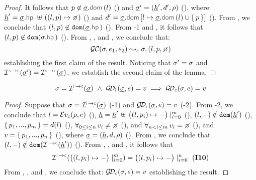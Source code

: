 \begin{proof}
    \noindent {} It follows that $p \not\in \istate.\domsel(\loc)$ () and 
       $\underline{\sigma}' = (\underline{h}', d', \rho)$ (), where: 
       $\iheap' = \istate.\hpsel \dunion ((\loc, p) \mapsto \none)$ () and $\idom' = \istate.\domsel[\loc \mapsto \istate.\domsel(\loc) \cup \jsilset{p}]$ (). 
       From , we conclude that $(\loc, p) \not\in \domain(\istate.\hpsel)$ ().
       From \hyp{1} and , it follows that $(\loc, p) \not\in \domain(\jstate.\hpsel)$ (). 
       From , , and , we conclude that: 
       $$
          \absgetcellrule{\concrete}{\jstate, \jsilexpr_1, \jsilexpr_2}{\jstate, (\loc, p, \none)}
       $$
       establishing the first claim of the result. Noticing that $\sigma' = \sigma$ and 
       $\interpret{\symbconc}{}(\istate') = \interpret{\symbconc}{}(\istate)$, we 
       establish the second claim of the lemma.
\end{proof}


\begin{lemma}\label{lemma:getdomain:erasure}
$$
\jstate = \interpret{\instconc}{}(\istate) \ \wedge \ 
  \absgetdomainfun{\instrumented}(\istate, \jsilexpr) = \val  
  \implies \absgetdomainfun{\concrete}(\jstate, \jsilexpr) = \val
$$
\end{lemma}
\begin{proof}
Suppose that $\jstate = \interpret{\instconc}{}(\istate)$ (\hyp{1}) and 
$\absgetdomainfun{\instrumented}(\istate, \jsilexpr) = \val$ (\hyp{2}). 
From \hyp{2}, we conclude that $\loc = \evalexpr{\concrete}(\store, \jsilexpr)$ (), 
$\underline{h} = \underline{h}' \, \uplus \, \big((l, p_i) \mapsto - \big)\mid_{i = 0}^m$ (\ieq{2}), 
$(l,-) \notin \texttt{dom} (\underline{h}')$ (\ieq{3}), 
$\{ \, p_1, ..., p_m \, \} = d(l)$ (), 
$\forall_{0 \leq i \leq n} \, \val_i \neq \none$ (), and
$\forall_{n < i \leq m} \, \val_i = \none$ (), 
and $v = \{ \, p_1, ..., p_n \, \}$ (), 
where $\underline{\sigma} =  (\underline{h}, d, \rho)$ (). 
From , we conclude that $(\loc,-) \notin \domain (\interpret{\instconc}{}(\iheap'))$ ().
From \ieq{2}, \ieq{5}, and \ieq{6}, it follows that 
$$
\interpret{\instconc}{}(\big((\loc, p_i) \mapsto - \big)\mid_{i = 0}^m)
   = \big((\loc, p_i) \mapsto - \big)\mid_{i = 0}^n \text{ (\ieq{10})}
$$
From , , and , we conclude that: 
$
\absgetdomainfun{\concrete}(\jstate, \jsilexpr) = \val
$
establishing the result. 
\end{proof}

